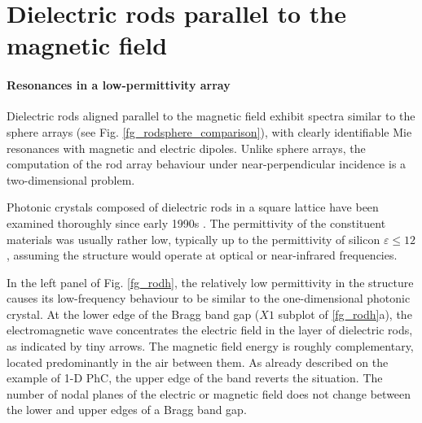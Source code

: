 %   
\FloatBarrier %
\section{Dielectric rods parallel to the magnetic field} %
\paragraph{Resonances in a low-permittivity array}	\label{sect_diel_rods_mag}	%
Dielectric rods aligned parallel to the magnetic field exhibit spectra similar to the sphere arrays (see Fig. \ref{fg_rodsphere_comparison}), with clearly identifiable Mie resonances with magnetic and electric dipoles.
Unlike sphere arrays, the computation of the rod array behaviour under near-perpendicular incidence is a two-dimensional problem. 

Photonic crystals composed of dielectric rods in a square lattice have been examined thoroughly since early 1990s \cite{plihal1991two, pendry1992_transfer_matrix}. The permittivity of the constituent materials was usually rather low, typically up to the permittivity of silicon $\varepsilon \leq 12$, assuming the structure would operate at optical or near-infrared frequencies. 

In the left panel of Fig. \ref{fg_rodh}, the relatively low permittivity in the structure causes its low-frequency behaviour to be similar to the one-dimensional photonic crystal. At the lower edge of the Bragg band gap ($X1$ subplot of \ref{fg_rodh}a), the electromagnetic wave concentrates the electric field in the layer of dielectric rods, as indicated by tiny arrows. The magnetic field energy is roughly complementary, located predominantly in the air between them. As already described on the example of 1-D PhC, the upper edge of the band reverts the situation. The number of nodal planes of the electric or magnetic field does not change between the lower and upper edges of a Bragg band gap.

